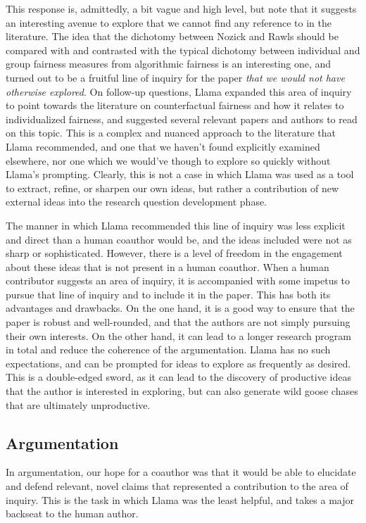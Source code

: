 This response is, admittedly, a bit vague and high level, but note that it
suggests an interesting avenue to explore that we cannot find any reference to in
the literature. The idea that the dichotomy between Nozick and Rawls should be 
compared with and contrasted with the typical dichotomy between individual and
group fairness measures from algorithmic fairness is an interesting one, and
turned out to be a fruitful line of inquiry for the paper \emph{that we would
not have otherwise explored}. On follow-up questions, Llama expanded this area
of inquiry to point towards the literature on counterfactual fairness and how it
relates to individualized fairness, and suggested several relevant papers and
authors to read on this topic. This is a complex and nuanced approach to the
literature that Llama recommended, and one that we haven't found explicitly
examined elsewhere, nor one which we would've though to explore so quickly
without Llama's prompting. Clearly, this is not a case in which Llama was used
as a tool to extract, refine, or sharpen our own ideas, but rather a contribution
of new external ideas into the research question development phase.

The manner in which Llama recommended this line of inquiry was less explicit and
direct than a human coauthor would be, and the ideas included were not as sharp
or sophisticated. However, there is a level of freedom in the engagement about 
these ideas that is not present in a human coauthor. When a human contributor
suggests an area of inquiry, it is accompanied with some impetus to pursue that
line of inquiry and to include it in the paper. This has both its advantages and
drawbacks. On the one hand, it is a good way to ensure that the paper is
robust and well-rounded, and that the authors are not simply pursuing their
own interests. On the other hand, it can lead to a longer research program in
total and reduce the coherence of the argumentation. Llama has no such
expectations, and can be prompted for ideas to explore as frequently as desired.
This is a double-edged sword, as it can lead to the discovery of productive
ideas that the author is interested in exploring, but can also generate wild
goose chases that are ultimately unproductive.

\subsection{Argumentation}

In argumentation, our hope for a coauthor was that it would be able to elucidate
and defend relevant, novel claims that represented a contribution to the area
of inquiry. This is the task in which Llama was the least helpful, and takes 
a major backseat to the human author.

